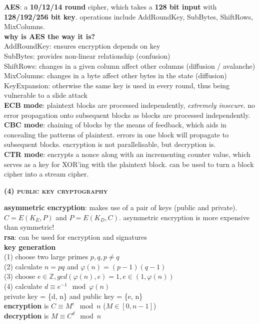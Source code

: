 \documentclass[a4paper]{article}
\begin{document}
\begin{multicols}{2}
\begin{framed}
	\noindent
	\textbf{AES}: a \textbf{10/12/14 round} cipher, which takes a \textbf{128 bit input} with \textbf{128/192/256 bit key}. operations include AddRoundKey, SubBytes, ShiftRows, MixColumns.\\
	
	\noindent
	\textbf{why is AES the way it is?}\\
	AddRoundKey: ensures encryption depends on key\\
	SubBytes: provides non-linear relationship (confusion)\\
	ShiftRows: changes in a given column affect other columns (diffusion / avalanche)\\
	MixColumns: changes in a byte affect other bytes in the state (diffusion)\\
	KeyExpansion: otherwise the same key is used in every round, thus being vulnerable to a slide attack\\
	
	\noindent
	\textbf{ECB mode}: plaintext blocks are processed independently, \textit{extremely insecure}. no error propagation onto subsequent blocks as blocks are processed independently.\\
	
	\noindent
	\textbf{CBC mode}: chaining of blocks by the means of feedback, which aids in concealing the patterns of plaintext. errors in one block will propagate to subsequent blocks. encryption is not parallelisable, but decryption is.\\
	
	\noindent
	\textbf{CTR mode}: encrypts a nonce along with an incrementing counter value, which serves as a key for XOR'ing with the plaintext block. can be used to turn a block cipher into a stream cipher.
\end{framed}

\begin{framed}
	\begin{center}
		\textbf{\textsc{(4) public key cryptography}}
	\end{center}
	
	\noindent
	\textbf{asymmetric encryption}: makes use of a pair of keys (public and private). $C = E(K_E, P)$ and $P = E(K_D, C)$. asymmetric encryption is more expensive than symmetric!\\
	
	\noindent
	\textbf{rsa}: can be used for encryption and signatures\\
	\textbf{key generation}\\
	(1) choose two large primes $p, q, p \neq q$\\
	(2) calculate $n = pq$ and $\varphi(n) = (p - 1)(q - 1)$\\
	(3) choose $e \in \mathbb{Z}, gcd(\varphi(n), e) = 1, e \in (1, \varphi(n))$\\
	(4) calculate $d \equiv e^{-1} \mod \varphi(n)$\\
	private key = \{d, n\} and public key = \{e, n\}\\
	\textbf{encryption} is $C \equiv M^e \mod n$ ($M \in [0, n -1]$)\\
	\textbf{decryption} is $M \equiv C^d \mod n$
\end{framed}


\end{multicols}
\end{document}

